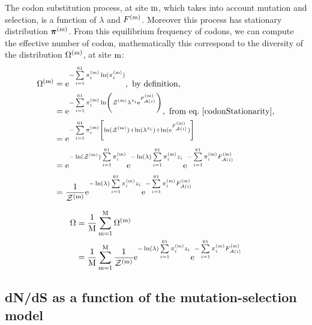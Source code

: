 The \gls{codon} \gls{substitution} process, at site $\text{m}$, which takes into account mutation and selection, is a function of $\lambda$ and $F^{(\text{m})}$.
Moreover this process has stationary distribution $\bm{\pi}^{(\text{m})}$.
From this equilibrium frequency of \glspl{codon}, we can compute the effective number of \gls{codon}, mathematically this correspond to the diversity of the distribution ${\Omega}^{(\text{m})}$, at site $\text{m}$:
\begin{align}
    {\Omega}^{(\text{m})}
    & = \mathrm{e}^{ - \sum\limits_{{i}=1}^{61}   \pi_{{i}}^{(\text{m})} \ln (  \pi_{{i}}^{(\text{m})} )}, \ \textrm{by definition},\\
    & = \mathrm{e}^{ - \sum\limits_{{i}=1}^{61}   \pi_{{i}}^{(\text{m})} \ln \left( \mathcal{Z}^{(\text{m})} \lambda^{{z}_{{i}}} \mathrm{e}^{F_{\mathcal{A}({i})}^{(\text{m})}} \right)}, \ \textrm{from eq.} \ \ref{codonStationarity},\\
    & = \mathrm{e}^{ - \sum\limits_{{i}=1}^{61}   \pi_{{i}}^{(\text{m})} \left[ \ln ( \mathcal{Z}^{(\text{m})} )+ \ln( \lambda^{{z}_{{i}}} ) + \ln (\mathrm{e}^{F_{\mathcal{A}({i})}^{(\text{m})}}) \right] }\\
    & = \mathrm{e}^{ - \ln ( \mathcal{Z}^{(\text{m})} ) \sum\limits_{{i}=1}^{61}   \pi_{{i}}^{(\text{m})} } \mathrm{e}^{ -  \ln (\lambda) \sum\limits_{{i}=1}^{61}   \pi_{{i}}^{(\text{m})} {z}_{{i}} }\mathrm{e}^{ - \sum\limits_{{i}=1}^{61}   \pi_{{i}}^{(\text{m})} F_{\mathcal{A}({i})}^{(\text{m})}  } \\
    & = \frac{1}{\mathcal{Z}^{(\text{m})}} \mathrm{e}^{ -  \ln (\lambda) \sum\limits_{{i}=1}^{61}   \pi_{{i}}^{(\text{m})} {z}_{{i}} }\mathrm{e}^{ - \sum\limits_{{i}=1}^{61}   \pi_{{i}}^{(\text{m})} F_{\mathcal{A}({i})}^{(\text{m})}  }
    \label{eq:sit-entropy}
\end{align}

\begin{align}
  {\Omega} & = \dfrac{1}{\text{M}} \sum\limits_{\text{m}=1}^{\text{M}} {\Omega}^{(\text{m})}\\
	& = \dfrac{1}{\text{M}} \sum\limits_{\text{m}=1}^{\text{M}} \frac{1}{\mathcal{Z}^{(\text{m})}} \mathrm{e}^{ -  \ln (\lambda) \sum\limits_{{i}=1}^{61}   \pi_{{i}}^{(\text{m})} {z}_{{i}} }\mathrm{e}^{ - \sum\limits_{{i}=1}^{61}   \pi_{{i}}^{(\text{m})} F_{\mathcal{A}({i})}^{(\text{m})}  }
	\label{entropy}
\end{align}

\subsection{dN/dS as a function of the mutation-selection model}

